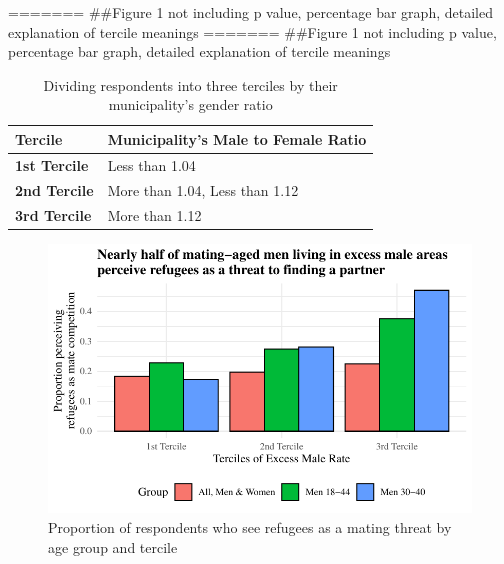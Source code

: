 \documentclass[
]{article}
\begin{document}
======= \#\#Figure 1 not including p value, percentage bar graph,
detailed explanation of tercile meanings ======= \#\#Figure 1 not
including p value, percentage bar graph, detailed explanation of tercile
meanings

\clearpage

\renewcommand{\arraystretch}{2}

\hypertarget{tbl-terc}{}
\begin{table}
\caption{\label{tbl-terc}Dividing respondents into three terciles by their municipality's gender
ratio }\tabularnewline

\centering
\begin{tabular}{>{\raggedright\arraybackslash}p{10em}>{\raggedright\arraybackslash}p{20em}}
\toprule
Tercile & Municipality's Male to Female Ratio\\
\midrule
\textbf{1st Tercile} & Less than 1.04\\
\textbf{2nd Tercile} & More than 1.04, Less than 1.12\\
\textbf{3rd Tercile} & More than 1.12\\
\bottomrule
\end{tabular}
\end{table}

\begin{figure}

{\centering \includegraphics{paper_files/figure-pdf/fig-excess-1.pdf}

}

\caption{\label{fig-excess}Proportion of respondents who see refugees as
a mating threat by age group and tercile}

\end{figure}

\clearpage
\end{document}
